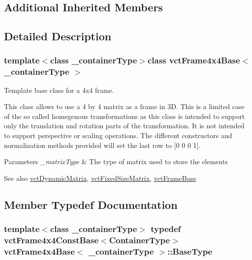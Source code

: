 \subsection*{Additional Inherited Members}


\subsection{Detailed Description}
\subsubsection*{template$<$class \+\_\+container\+Type$>$class vct\+Frame4x4\+Base$<$ \+\_\+container\+Type $>$}

Template base class for a 4x4 frame. 

This class allows to use a 4 by 4 matrix as a frame in 3\+D. This is a limited case of the so called homegenous transformations as this class is intended to support only the translation and rotation parts of the transformation. It is not intended to support perspective or scaling operations. The different constructors and normalization methods provided will set the last row to \mbox{[}0 0 0 1\mbox{]}.


\begin{DoxyParams}{Parameters}
{\em \+\_\+matrix\+Type} & The type of matrix used to store the elements\\
\hline
\end{DoxyParams}
\begin{DoxySeeAlso}{See also}
\hyperlink{classvct_dynamic_matrix}{vct\+Dynamic\+Matrix}, \hyperlink{classvct_fixed_size_matrix}{vct\+Fixed\+Size\+Matrix}, \hyperlink{classvct_frame_base}{vct\+Frame\+Base} 
\end{DoxySeeAlso}


\subsection{Member Typedef Documentation}
\hypertarget{classvct_frame4x4_base_afdce5a53de5e8e244a2e05b4843226bb}{}
\subsubsection[{Base\+Type}]{\setlength{\rightskip}{0pt plus 5cm}template$<$class \+\_\+container\+Type$>$ typedef {\bf vct\+Frame4x4\+Const\+Base}$<${\bf Container\+Type}$>$ {\bf vct\+Frame4x4\+Base}$<$ \+\_\+container\+Type $>$\+::{\bf Base\+Type}}\label{classvct_frame4x4_base_afdce5a53de5e8e244a2e05b4843226bb}
\hypertarget{classvct_frame4x4_base_a5c1b952e27a3cafa0cc196c2a36c33e7}{}
